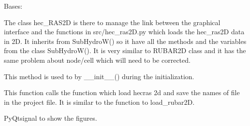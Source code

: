 \documentclass[letterpaper,10pt,english]{sphinxmanual}
\begin{document}
\begin{fulllineitems}
\label{\detokenize{index:src_GUI.hydro_GUI_2.HEC_RAS2D}}
Bases: {\hyperref[\detokenize{index:src_GUI.hydro_GUI_2.SubHydroW}]{}}

The class hec\_RAS2D is there to manage the link between the graphical interface and the functions in src/hec\_ras2D.py
which loads the hec\_ras2D data in 2D. It inherits from SubHydroW() so it have all the methods and the variables
from the class SubHydroW(). It is very similar to RUBAR2D class and it has the same problem about node/cell
which will need to be corrected.

\begin{fulllineitems}
\label{\detokenize{index:src_GUI.hydro_GUI_2.HEC_RAS2D.init_iu}}
This method is used to by \_\_init\_\_() during the initialization.

\end{fulllineitems}


\begin{fulllineitems}
\label{\detokenize{index:src_GUI.hydro_GUI_2.HEC_RAS2D.load_hec_2d_gui}}
This function calls the function which load hecras 2d and save the names of file in the project file.
It is similar to the function to load\_rubar2D.

\end{fulllineitems}


\begin{fulllineitems}
\label{\detokenize{index:src_GUI.hydro_GUI_2.HEC_RAS2D.show_fig}}
PyQtsignal to show the figures.

\end{fulllineitems}


\end{fulllineitems}

\end{document}
